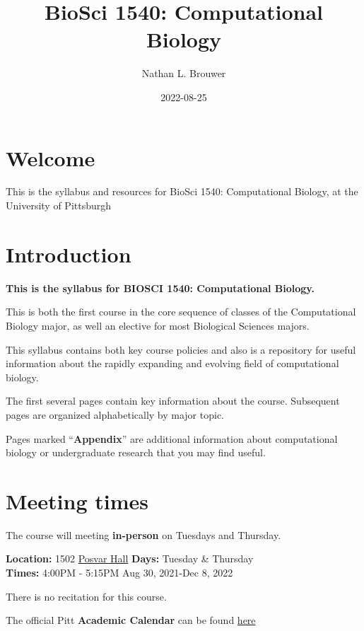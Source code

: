 \documentclass[
]{book}
\title{BioSci 1540: Computational Biology}
\author{Nathan L. Brouwer}
\date{2022-08-25}
\begin{document}
\maketitle

{
\setcounter{tocdepth}{1}
\tableofcontents
}
\hypertarget{welcome}{%
\chapter{Welcome}\label{welcome}}

This is the syllabus and resources for BioSci 1540: Computational Biology, at the University of Pittsburgh

\hypertarget{intro}{%
\chapter{Introduction}\label{intro}}

\textbf{This is the syllabus for BIOSCI 1540: Computational Biology.}

This is both the first course in the core sequence of classes of the Computational Biology major, as well an elective for most Biological Sciences majors.

This syllabus contains both key course policies and also is a repository for useful information about the rapidly expanding and evolving field of computational biology.

The first several pages contain key information about the course. Subsequent pages are organized alphabetically by major topic.

Pages marked ``\textbf{Appendix}'' are additional information about computational biology or undergraduate research that you may find useful.

\hypertarget{meeting-times}{%
\chapter{Meeting times}\label{meeting-times}}

The course will meeting \textbf{in-person} on Tuesdays and Thursday.

\textbf{Location:} 1502 \href{https://www.tour.pitt.edu/tour/wesley-w-posvar-hall}{Posvar Hall}
\textbf{Days:} Tuesday \& Thursday\\
\textbf{Times:} 4:00PM - 5:15PM
Aug 30, 2021-Dec 8, 2022

There is no recitation for this course.

The official Pitt \textbf{Academic Calendar} can be found \href{https://www.registrar.pitt.edu/sites/default/files/pdf/Academic\%20Calendar\%202022-2023_Apple.pdf}{here}
\end{document}
